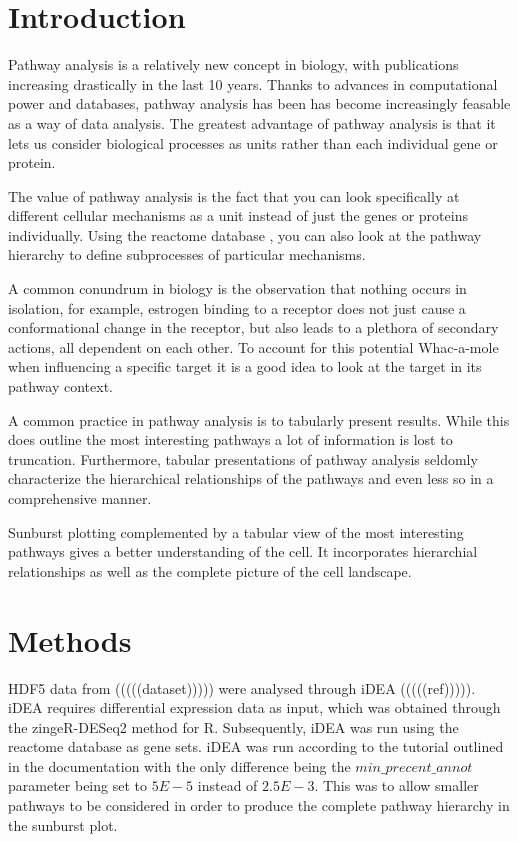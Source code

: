 \documentclass[11pt]{article}
\begin{document}
\maketitle


\begin{abstract}

\end{abstract}

\section*{Introduction}
  Pathway analysis is a relatively new concept in biology, with publications increasing drastically in the last 10 years. Thanks to advances in computational power and databases, pathway analysis has been has become increasingly feasable as a way of data analysis. The greatest advantage of pathway analysis is that it lets us consider biological processes as units rather than each individual gene or protein.

  The value of pathway analysis is the fact that you can look specifically at different cellular mechanisms as a unit instead of just the genes or proteins individually. Using the reactome database \cite{reactome}, you can also look at the pathway hierarchy to define subprocesses of particular mechanisms.

  A common conundrum in biology is the observation that nothing occurs in isolation, for example, estrogen binding to a receptor does not just cause a conformational change in the receptor, but also leads to a plethora of secondary actions, all dependent on each other. To account for this potential Whac-a-mole when influencing a specific target it is a good idea to look at the target in its pathway context.

  A common practice in pathway analysis is to tabularly present results. While this does outline the most interesting pathways a lot of information is lost to truncation. Furthermore, tabular presentations of pathway analysis seldomly characterize the hierarchical relationships of the pathways and even less so in a comprehensive manner.

  Sunburst plotting complemented by a tabular view of the most interesting pathways gives a better understanding of the cell. It incorporates hierarchial relationships as well as the complete picture of the cell landscape.



\section*{Methods}
  HDF5 data from (((((dataset))))) were analysed through iDEA (((((ref))))). iDEA requires differential expression data as input, which was obtained through the zingeR-DESeq2 method for R. Subsequently, iDEA was run using the reactome database as gene sets. iDEA was run according to the tutorial outlined in the documentation with the only difference being the $min\_precent\_annot$ parameter being set to $5E-5$ instead of $2.5E-3$. This was to allow smaller pathways to be considered in order to produce the complete pathway hierarchy in the sunburst plot.
\end{document}
